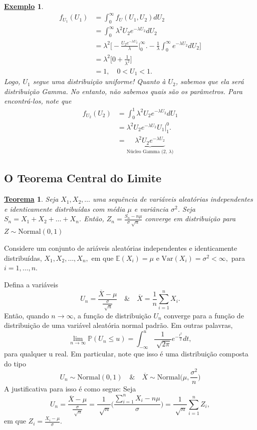 \documentclass{article}
\newtheorem*{theorem*}{\underline{Teorema}}
\newtheorem{example}{\underline{Exemplo}}
\begin{document}
\begin{example}
\begin{align*}
    f_{U_{1}}(U_{1}) &= \int_{0}^{\infty}f_{U}(U_{1}, U_{2}) dU_{2} \\
                     &= \int_{0}^{\infty}\lambda ^{2}U_{2}e^{-\lambda U_{2}}dU_{2}\\
                     &= \lambda ^{2}\biggl[-\frac{U_{2}e^{-\lambda U_{2}}}{\lambda }\biggl|_{0}^{\infty}\biggr. - \frac{1}{\lambda }\int_{0}^{\infty}e^{-\lambda U_{2}}dU_{2}\biggr]\\
                     &= \lambda ^{2}\biggl[ 0 + \frac{1}{\lambda^{2}} \biggr]\\
                     &= 1,\quad 0 < U_{1} < 1.
  \end{align*}
  Logo, \(U_{1}\) segue uma distribuição uniforme! Quanto à \(U_{2}\), sabemos que ela será distribuição Gamma. No entanto,
  não sabemos quais são os parâmetros. Para encontrá-los, note que 
  \begin{align*}
    f_{U_{2}}(U_{2}) &= \int_{0}^{1}\lambda ^{2} U_{2}e^{-\lambda U_{2}}dU_{1} \\
                     &= \lambda ^{2} U_{2}e^{-\lambda U_{2}}U_{1}\biggl|_{1}^{0}\biggr.\\
                     &= \underbrace{\lambda ^{2}U_{2}e^{-\lambda U_{2}}}_{\text{Núcleo Gamma (2, }\lambda \text{)}}
  \end{align*}
\end{example}
\subsection{O Teorema Central do Limite}
\begin{theorem*}
  Seja \(X_{1}, X_2, \dotsc \) uma sequência de variáveis aleatórias independentes e identicamente distribuídas com média \(\mu \) e variância 
 \(\sigma ^{2}\). Seja \(S_{n} = X_{1} + X_{2} + \dotsc +X_{n}\). Então, \(Z_{n} = \frac{S_{n} -n\mu }{\sigma \sqrt[]{n}}\) converge em distribuição para 
 \(Z\sim \mathrm{Normal}(0, 1)\)
\end{theorem*}
Considere um conjunto de ariáveis aleatórias independentes e identicamente distribuídas, \(X_{1}, X_{2}, \dotsc , X_{n},\) em que \(\mathbb{E}(X_{i}) = \mu\) e 
\(\mathrm{Var}(X_{i}) = \sigma^{2} < \infty,\) para \(i = 1, \dotsc , n.\)

Defina a variáveis 
\[
  U_{n} = \frac{\overline{X} - \mu}{\frac{\sigma }{\sqrt[]{n}}}\quad\&\quad \overline{X} = \frac{1}{n}\sum\limits_{i=1}^{n}X_{i}.
\]
Então, quando \(n\to\infty\), a função de distribuição \(U_{n}\) converge para a função de distribuição de uma variável aleatória
normal padrão. Em outras palavras, 
\[
  \lim_{n\to \infty}\mathbb{P}(U_{n}\leq u) = \int_{-\infty}^{u}\frac{1}{\sqrt[]{2\pi }}e^{-\frac{t^{2}}{2}}dt,
\]
para qualquer u real. Em particular, note que isso é uma distribuição composta do tipo 
  \[
    U_{n}\sim \mathrm{Normal}(0, 1)\quad\&\quad \overline{X}\sim \mathrm{Normal}\biggl(\mu, \frac{\sigma ^{2}}{n}\biggr)
  \]
  A justificativa para isso é como segue: Seja 
  \[
    U_{n} = \frac{\overline{X} - \mu }{\frac{\sigma }{\sqrt[]{n}}} = \frac{1}{\sqrt[]{n}}\biggl(\frac{\sum\limits_{i=1}^{n}X_{i} - n\mu }{\sigma }\biggr) = \frac{1}{\sqrt[]{n}}\sum\limits_{i=1}^{n}Z_{i},
  \]
  em que \(Z_{i} = \frac{X_{i}-\mu}{\sigma }\).
\end{document}
